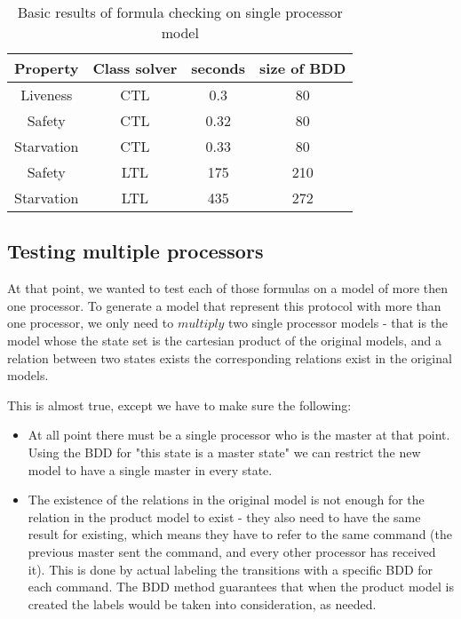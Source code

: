 \documentclass[11pt]{article}
\begin{document}
        \begin{table}[h!]
        \centering
        \begin{tabular}{||c c c c||} 
            \hline
            Property & Class solver & seconds & size of BDD \\ [0.5ex] 
            \hline\hline
            Liveness & CTL & 0.3 & 80 \\ 
            Safety & CTL & 0.32 & 80 \\
            Starvation & CTL & 0.33 & 80 \\
            Safety & LTL & 175 & 210 \\            
            Starvation & LTL & 435 & 272 \\ [1ex] 
            \hline
        \end{tabular}
        \caption{Basic results of formula checking on single processor model}
        \label{table:1}
        \end{table}

    \subsection{Testing multiple processors}
        At that point, we wanted to test each of those formulas on a model of more then one processor.
        To generate a model that represent this protocol with more than one processor, we only need
        to $multiply$ two single processor models - that is the model whose the state set is the cartesian
        product of the original models, and a relation between two states exists \Leftrightarrow the corresponding
        relations exist in the original models.

        This is almost true, except we have to make sure the following:

        \begin{itemize}
            \item At all point there must be a single processor who is the master at that point.
            Using the BDD for "this state is a master state" we can restrict the new model to have
            a single master in every state.
            \item The existence of the relations in the original model is not enough for the relation
            in the product model to exist - they also need to have the same result for existing, which means
            they have to refer to the same command (the previous master sent the command, and every other 
            processor has received it). This is done by actual labeling the transitions with a specific BDD
            for each command. The BDD method guarantees that when the product model is created the labels would
            be taken into consideration, as needed.
        \end{itemize}
\end{document}
